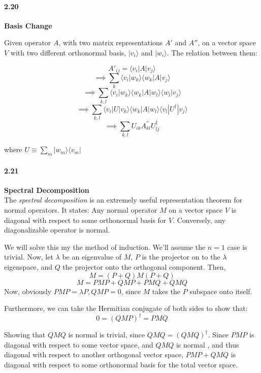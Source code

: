 \paragraph{2.20} \textbf{Basis Change} %

Given operator $A$, with two matrix representations $A'$ and $A''$, on a vector space $V$ with two different orthonormal basis, $|v_i\rangle$ and $|w_i\rangle$.
The relation between them:

$$ A'_{ij} = \langle v_i |A | v_j \rangle $$
$$  \implies \sum_k \langle v_i | w_k \rangle \langle w_k |A | v_j \rangle $$
$$  \implies \sum_{k,l} \langle v_i | w_k \rangle \langle w_k |A | w_l \rangle \langle w_l | v_j \rangle $$
$$  \implies \sum_{k,l} \langle v_i |U| v_k \rangle \langle w_k |A | w_l \rangle \langle v_l |U^{\dagger}| v_j \rangle $$
$$  \implies \sum_{k,l} U_{ik} A_{kl}^{''} U_{lj}^{\dagger} $$

where $U \equiv \sum_m |w_m\rangle \langle v_m|$

\paragraph{2.21} \textbf{Spectral Decomposition}%
\\

The \emph{spectral decomposition} is an extremely useful representation theorem for normal operators. It states:
Any normal operator $M$ on a vector space $V$ is diagonal with respect to some orthonormal basis for $V$. Conversely, any diagonalizable operator is normal.

We will solve this my the method of induction. We'll assume the $n = 1$ case is trivial. Now, let $\lambda $ be an eigenvalue of $M$, $P$ is the projector on to the $\lambda$ eigenspace, and $Q$ the projector onto the orthogonal component. 
Then, 
$$ M = (P+Q) M (P+Q) $$
$$ M = PMP + QMP + PMQ + QMQ $$
Now, obviously $PMP = \lambda P , QMP = 0$, since $M$ takes the $P$ subspace onto itself. 

Furthermore, we can take the Hermitian conjugate of both sides to show that:
$$ 0 = (QMP)^{\dagger} = PMQ$$

Showing that $QMQ$ is normal is trivial, since $QMQ = (QMQ)^{\dagger}$. 
Since $PMP$ is diagonal with respect to some vector space, and $QMQ$ is normal , and thus diagonal with respect to another orthogonal vector space, $PMP + QMQ$ is diagonal with respect to some orthonormal basis for the total vector space.

